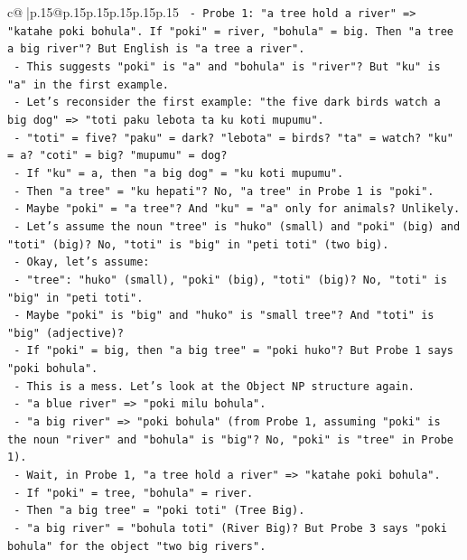 \documentclass{article}
\begin{document}
{\begin{supertabular}{c@{$\;$}|p{.15\linewidth}@{}p{.15\linewidth}p{.15\linewidth}p{.15\linewidth}p{.15\linewidth}p{.15\linewidth}}
{{{\texttt{    {-} Probe 1: "a tree hold a river" => "katahe poki bohula". If "poki" = river, "bohula" = big. Then "a tree a big river"? But English is "a tree a river".} \\
\texttt{    {-} This suggests "poki" is "a" and "bohula" is "river"? But "ku" is "a" in the first example.} \\
\texttt{    {-} Let's reconsider the first example: "the five dark birds watch a big dog" => "toti paku lebota ta ku koti mupumu".} \\
\texttt{      {-} "toti" = five? "paku" = dark? "lebota" = birds? "ta" = watch? "ku" = a? "coti" = big? "mupumu" = dog?} \\
\texttt{      {-} If "ku" = a, then "a big dog" = "ku koti mupumu".} \\
\texttt{      {-} Then "a tree" = "ku hepati"? No, "a tree" in Probe 1 is "poki".} \\
\texttt{      {-} Maybe "poki" = "a tree"? And "ku" = "a" only for animals? Unlikely.} \\
\texttt{      {-} Let's assume the noun "tree" is "huko" (small) and "poki" (big) and "toti" (big)? No, "toti" is "big" in "peti toti" (two big).} \\
\texttt{      {-} Okay, let's assume:} \\
\texttt{        {-} "tree": "huko" (small), "poki" (big), "toti" (big)? No, "toti" is "big" in "peti toti".} \\
\texttt{        {-} Maybe "poki" is "big" and "huko" is "small tree"? And "toti" is "big" (adjective)?} \\
\texttt{        {-} If "poki" = big, then "a big tree" = "poki huko"? But Probe 1 says "poki bohula".} \\
\texttt{        {-} This is a mess. Let's look at the Object NP structure again.} \\
\texttt{        {-} "a blue river" => "poki milu bohula".} \\
\texttt{        {-} "a big river" => "poki bohula" (from Probe 1, assuming "poki" is the noun "river" and "bohula" is "big"? No, "poki" is "tree" in Probe 1).} \\
\texttt{        {-} Wait, in Probe 1, "a tree hold a river" => "katahe poki bohula".} \\
\texttt{          {-} If "poki" = tree, "bohula" = river.} \\
\texttt{          {-} Then "a big tree" = "poki toti" (Tree Big).} \\
\texttt{          {-} "a big river" = "bohula toti" (River Big)? But Probe 3 says "poki bohula" for the object "two big rivers".} \\
}}}
\end{supertabular}}
\end{document}
